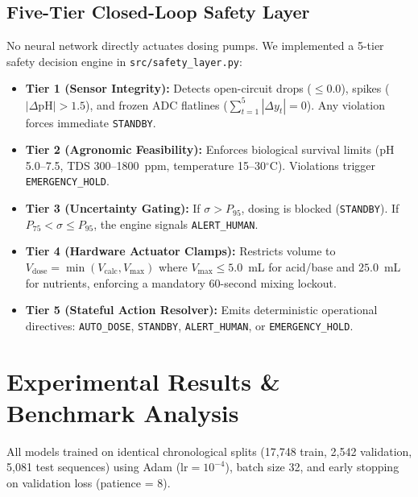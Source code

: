\documentclass[conference]{IEEEtran}
\begin{document}
\subsection{Five-Tier Closed-Loop Safety Layer}
No neural network directly actuates dosing pumps. We implemented a 5-tier safety decision engine in \texttt{src/safety\_layer.py}:
\begin{itemize}
    \item \textbf{Tier 1 (Sensor Integrity):} Detects open-circuit drops ($\le 0.0$), spikes ($|\Delta \mathrm{pH}| > 1.5$), and frozen ADC flatlines ($\sum_{t=1}^5 |\Delta y_t| = 0$). Any violation forces immediate \texttt{STANDBY}.
    \item \textbf{Tier 2 (Agronomic Feasibility):} Enforces biological survival limits (pH 5.0--7.5, TDS 300--1800~ppm, temperature 15--30$^\circ\mathrm{C}$). Violations trigger \texttt{EMERGENCY\_HOLD}.
    \item \textbf{Tier 3 (Uncertainty Gating):} If $\sigma > P_{95}$, dosing is blocked (\texttt{STANDBY}). If $P_{75} < \sigma \le P_{95}$, the engine signals \texttt{ALERT\_HUMAN}.
    \item \textbf{Tier 4 (Hardware Actuator Clamps):} Restricts volume to $V_{\mathrm{dose}} = \min(V_{\mathrm{calc}}, V_{\max})$ where $V_{\max} \le 5.0$~mL for acid/base and $25.0$~mL for nutrients, enforcing a mandatory 60-second mixing lockout.
    \item \textbf{Tier 5 (Stateful Action Resolver):} Emits deterministic operational directives: \texttt{AUTO\_DOSE}, \texttt{STANDBY}, \texttt{ALERT\_HUMAN}, or \texttt{EMERGENCY\_HOLD}.
\end{itemize}

\section{Experimental Results \& Benchmark Analysis}
All models trained on identical chronological splits (17,748 train, 2,542 validation, 5,081 test sequences) using Adam ($\mathrm{lr} = 10^{-4}$), batch size 32, and early stopping on validation loss (patience = 8).
\end{document}
